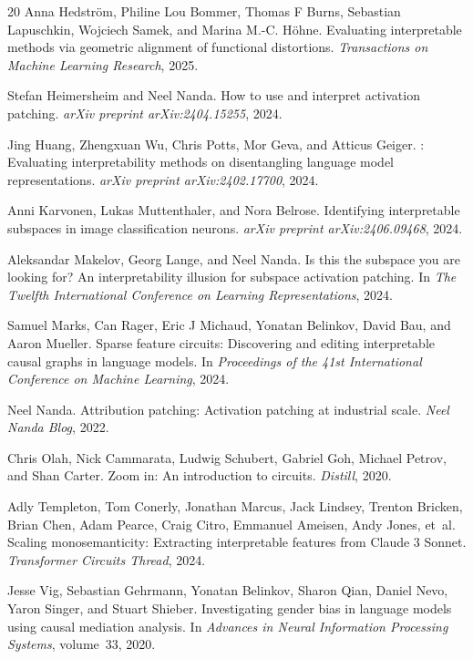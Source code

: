 \documentclass{article}
\begin{document}
\begin{thebibliography}{20}
Anna Hedstr{\"o}m, Philine Lou Bommer, Thomas F Burns, Sebastian Lapuschkin, Wojciech Samek, and Marina M.-C. H{\"o}hne.
\newblock Evaluating interpretable methods via geometric alignment of functional distortions.
\newblock \emph{Transactions on Machine Learning Research}, 2025.

Stefan Heimersheim and Neel Nanda.
\newblock How to use and interpret activation patching.
\newblock \emph{arXiv preprint arXiv:2404.15255}, 2024.

Jing Huang, Zhengxuan Wu, Chris Potts, Mor Geva, and Atticus Geiger.
: Evaluating interpretability methods on disentangling language model representations.
\newblock \emph{arXiv preprint arXiv:2402.17700}, 2024.

Anni Karvonen, Lukas Muttenthaler, and Nora Belrose.
\newblock Identifying interpretable subspaces in image classification neurons.
\newblock \emph{arXiv preprint arXiv:2406.09468}, 2024.

Aleksandar Makelov, Georg Lange, and Neel Nanda.
\newblock Is this the subspace you are looking for? An interpretability illusion for subspace activation patching.
\newblock In \emph{The Twelfth International Conference on Learning Representations}, 2024.

Samuel Marks, Can Rager, Eric J Michaud, Yonatan Belinkov, David Bau, and Aaron Mueller.
\newblock Sparse feature circuits: Discovering and editing interpretable causal graphs in language models.
\newblock In \emph{Proceedings of the 41st International Conference on Machine Learning}, 2024.

Neel Nanda.
\newblock Attribution patching: Activation patching at industrial scale.
\newblock \emph{Neel Nanda Blog}, 2022.

Chris Olah, Nick Cammarata, Ludwig Schubert, Gabriel Goh, Michael Petrov, and Shan Carter.
\newblock Zoom in: An introduction to circuits.
\newblock \emph{Distill}, 2020.

Adly Templeton, Tom Conerly, Jonathan Marcus, Jack Lindsey, Trenton Bricken, Brian Chen, Adam Pearce, Craig Citro, Emmanuel Ameisen, Andy Jones, et~al.
\newblock Scaling monosemanticity: Extracting interpretable features from Claude 3 Sonnet.
\newblock \emph{Transformer Circuits Thread}, 2024.

Jesse Vig, Sebastian Gehrmann, Yonatan Belinkov, Sharon Qian, Daniel Nevo, Yaron Singer, and Stuart Shieber.
\newblock Investigating gender bias in language models using causal mediation analysis.
\newblock In \emph{Advances in Neural Information Processing Systems}, volume~33, 2020.

\end{thebibliography}
\end{document}
